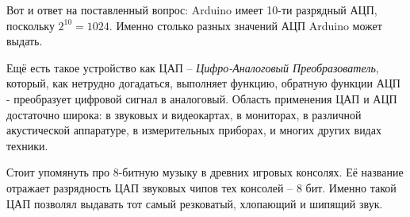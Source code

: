 \documentclass[../sparc.tex]{subfiles}
\begin{document}
Вот и ответ на поставленный вопрос: Arduino имеет 10-ти разрядный АЦП, поскольку
$2^{10} = 1024$.  Именно столько разных значений АЦП Arduino может выдать.

Ещё есть такое устройство как ЦАП -- \emph{Цифро-Аналоговый Преобразователь},
который, как нетрудно догадаться, выполняет функцию, обратную функции АЦП -
преобразует цифровой сигнал в аналоговый. Область применения ЦАП и АЦП
достаточно широка: в звуковых и видеокартах, в мониторах, в различной
акустической аппаратуре, в измерительных приборах, и многих других видах
техники.

Стоит упомянуть про 8-битную музыку в древних игровых консолях. Её название
отражает разрядность ЦАП звуковых чипов тех консолей -- 8 бит. Именно такой ЦАП
позволял выдавать тот самый резковатый, хлопающий и шипящий звук.
\end{document}
